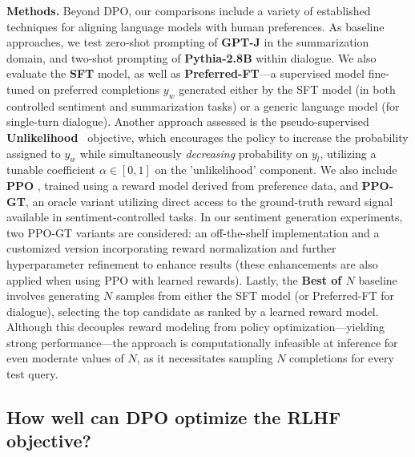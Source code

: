\textbf{Methods.} Beyond DPO, our comparisons include a variety of established techniques for aligning language models with human preferences. As baseline approaches, we test zero-shot prompting of \textbf{GPT-J} \citep{gpt-j} in the summarization domain, and two-shot prompting of \textbf{Pythia-2.8B} \citep{biderman2023pythia} within dialogue. We also evaluate the \textbf{SFT} model, as well as \textbf{Preferred-FT}—a supervised model fine-tuned on preferred completions $y_w$ generated either by the SFT model (in both controlled sentiment and summarization tasks) or a generic language model (for single-turn dialogue). Another approach assessed is the pseudo-supervised \textbf{Unlikelihood}~\citep{welleck2019neural} objective, which encourages the policy to increase the probability assigned to $y_w$ while simultaneously \textit{decreasing} probability on $y_l$, utilizing a tunable coefficient $\alpha\in[0,1]$ on the 'unlikelihood' component. We also include \textbf{PPO} \citep{schulman2017proximal}, trained using a reward model derived from preference data, and \textbf{PPO-GT}, an oracle variant utilizing direct access to the ground-truth reward signal available in sentiment-controlled tasks. In our sentiment generation experiments, two PPO-GT variants are considered: an off-the-shelf implementation \cite{leandro_von_werra_2023_7790115} and a customized version incorporating reward normalization and further hyperparameter refinement to enhance results (these enhancements are also applied when using PPO with learned rewards). Lastly, the \textbf{Best of $N$} baseline involves generating $N$ samples from either the SFT model (or Preferred-FT for dialogue), selecting the top candidate as ranked by a learned reward model. Although this decouples reward modeling from policy optimization—yielding strong performance—the approach is computationally infeasible at inference for even moderate values of $N$, as it necessitates sampling $N$ completions for every test query.

\subsection{How well can DPO optimize the RLHF objective?}

